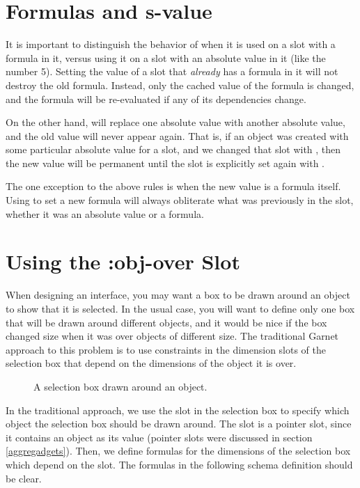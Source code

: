 \section{Formulas and s-value}

It is important to distinguish the behavior of  when it is
used on a slot with a formula in it, versus using it on a slot with an
absolute value in it (like the number 5).  Setting the value of a slot that
{\it already} has a formula in it will not destroy the old formula.
Instead, only the cached value of the formula is changed, and the
formula will be re-evaluated if any of its dependencies change.

On the other hand,  will replace one absolute value with
another absolute value, and the old value will never appear again.
That is, if an object was created with some particular absolute value for a
slot, and we changed that slot with , then the new value
will be permanent until the slot is explicitly set again with .

The one exception to the above rules is when the new value is a
formula itself.  Using  to set a new formula will always
obliterate what was previously in the slot, whether it was an absolute
value or a formula.


\section{Using the :obj-over Slot}
\label{obj-over-slot}

When designing an interface, you may want a box to be drawn
around an object to show that it is selected.  In the usual case, you
will want to define only one box that will be drawn around different
objects, and it would be nice if the box changed size when it was over
objects of different size.  The traditional Garnet approach to this
problem is to use constraints in the dimension slots of the selection
box that depend on the dimensions of the object it is over.

\begin{figure}
\begin{center}
\end{center}
\caption{A selection box drawn around an object.}
\end{figure}

In the traditional approach, we use the slot  in the
selection box to specify which object the selection box should be
drawn around.  The  slot is a pointer slot, since it
contains an object as its value (pointer slots were discussed in
section \ref{aggregadgets}).  Then, we define formulas for the
dimensions of the selection box which depend on the 
slot.  The formulas in the following schema definition should be clear.

